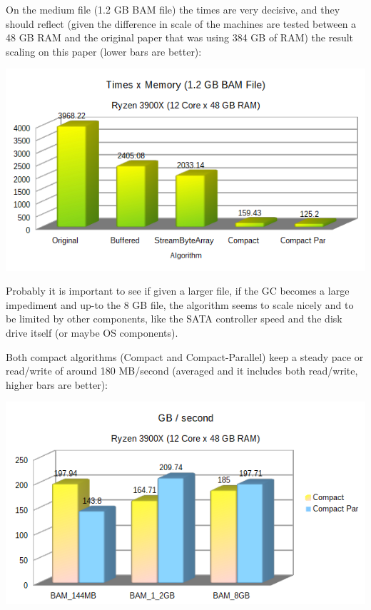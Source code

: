 \documentclass[a4paper,twoside]{article}
\begin{document}
On the medium file (1.2 GB BAM file) the times are very decisive, and they should reflect (given the difference in scale of the machines are tested between a 48 GB RAM and the original paper that was using 384 GB of RAM) the result scaling on this paper (lower bars are better):

\begin{center}
	\includegraphics[scale=0.5]{images/times_and_memory_chart.png}
\end{center}

Probably it is important to see if given a larger file, if the GC becomes a large impediment and up-to the 8 GB file, the algorithm seems to scale nicely and to be limited by other components, like the SATA controller speed and the disk drive itself (or maybe OS components).

Both compact algorithms (Compact and Compact-Parallel) keep a steady pace or read/write of around 180 MB/second (averaged and it includes both read/write, higher bars are better):

\begin{center}
	\includegraphics[scale=0.5]{images/seconds_per_gb_ryzen.png}
\end{center}
\end{document}
